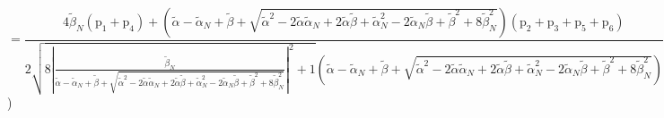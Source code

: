 \documentclass[12pt,a4paper]{article}
\begin{document}
\begin{itemize}
$$ $$ $$ = \frac{4 \tilde{\beta}_{N} \left(\text{p}_{1} + \text{p}_{4}\right) + \left(\tilde{\alpha} - \tilde{\alpha}_{N} + \tilde{\beta} + \sqrt{\tilde{\alpha}^{2} - 2 \tilde{\alpha} \tilde{\alpha}_{N} + 2 \tilde{\alpha} \tilde{\beta} + \tilde{\alpha}_{N}^{2} - 2 \tilde{\alpha}_{N} \tilde{\beta} + \tilde{\beta}^{2} + 8 \tilde{\beta}_{N}^{2}}\right) \left(\text{p}_{2} + \text{p}_{3} + \text{p}_{5} + \text{p}_{6}\right)}{2 \sqrt{8 \left|{\frac{\tilde{\beta}_{N}}{\tilde{\alpha} - \tilde{\alpha}_{N} + \tilde{\beta} + \sqrt{\tilde{\alpha}^{2} - 2 \tilde{\alpha} \tilde{\alpha}_{N} + 2 \tilde{\alpha} \tilde{\beta} + \tilde{\alpha}_{N}^{2} - 2 \tilde{\alpha}_{N} \tilde{\beta} + \tilde{\beta}^{2} + 8 \tilde{\beta}_{N}^{2}}}}\right|^{2} + 1} \left(\tilde{\alpha} - \tilde{\alpha}_{N} + \tilde{\beta} + \sqrt{\tilde{\alpha}^{2} - 2 \tilde{\alpha} \tilde{\alpha}_{N} + 2 \tilde{\alpha} \tilde{\beta} + \tilde{\alpha}_{N}^{2} - 2 \tilde{\alpha}_{N} \tilde{\beta} + \tilde{\beta}^{2} + 8 \tilde{\beta}_{N}^{2}}\right)} 
 $$ 
 )


\end{itemize}
\end{document}
